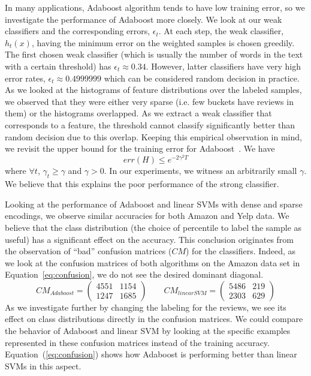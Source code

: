 \documentclass[letterpaper]{article}
\begin{document}
In many applications, Adaboost algorithm tends to have low training
error, so we investigate the performance of Adaboost more closely. We
look at our weak classifiers and the corresponding errors,
$\epsilon_t$. At each step, the weak classifier, $h_t(x)$, having the
minimum error on the weighted samples is chosen greedily. The first
chosen weak classifier (which is usually the number of words in the
text with a certain threshold) has $\epsilon_t \approx 0.34$. However,
latter classifiers have very high error rates, $\epsilon_t \approx
0.4999999$ which can be considered random decision in practice. As we
looked at the histograms of feature distributions over the labeled
samples, we observed that they were either very sparse (i.e. few
buckets have reviews in them) or the histograms overlapped. As we
extract a weak classifier that corresponds to a feature, the threshold
cannot classify significantly better than random decision due to this
overlap. Keeping this empirical observation in mind, we revisit the
upper bound for the training error for
Adaboost~\cite{adaboost,adaboost2}. We have
\[
err(H) \leq e^{-2\gamma^2 T}
\]
where $\forall t$, $\gamma_t \geq \gamma $ and $\gamma > 0$. In our
experiments, we witness an arbitrarily small $\gamma$. We believe that
this explains the poor performance of the strong classifier.

Looking at the performance of Adaboost and linear SVMs with dense and
sparse encodings, we observe similar accuracies for both Amazon and
Yelp data. We believe that the class distribution (the choice of
percentile to label the sample as useful) has a significant effect on
the accuracy. This conclusion originates from the observation of
``bad'' confusion matrices ($CM$) for the classifiers. Indeed, as we
look at the confusion matrices of both algorithms on the Amazon data
set in Equation~\ref{eq:confusion}, we do not see the desired dominant
diagonal.
\begin{equation}
\label{eq:confusion}
CM_{Adaboost} = \left(
\begin{matrix}
4551 & 1154\\
1247 & 1685
\end{matrix}
\right)
\qquad
CM_{linearSVM} = \left(
\begin{matrix}
5486 & 219\\
2303 & 629
\end{matrix}
\right)
\end{equation}
As we investigate further by changing the labeling for the reviews, we
see its effect on class distributions directly in the confusion
matrices. We could compare the behavior of Adaboost and linear SVM by
looking at the specific examples represented in these confusion
matrices instead of the training
accuracy. Equation~(\ref{eq:confusion}) shows how Adaboost is
performing better than linear SVMs in this aspect.
\end{document}
